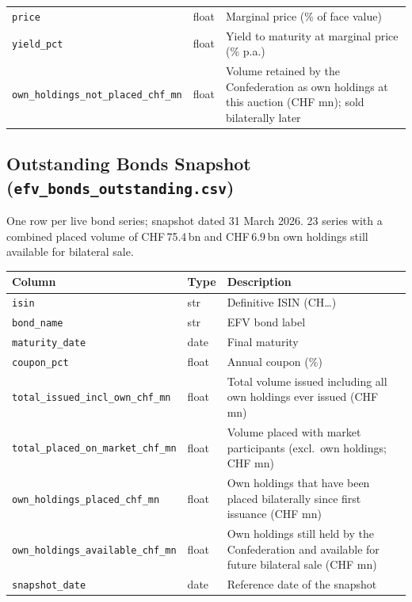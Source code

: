 \documentclass[12pt,a4paper]{article}
\begin{document}
\begin{longtable}{L{4.4cm} L{2.3cm} L{7.1cm}}
  \texttt{price}                  & float & Marginal price (\% of face value) \\[3pt]
  \texttt{yield\_pct}             & float & Yield to maturity at marginal price
                                            (\% p.a.) \\[3pt]
  \texttt{own\_holdings\_not\_placed\_chf\_mn} & float & Volume retained by the
                                            Confederation as own holdings
                                            at this auction (CHF mn);
                                            sold bilaterally later \\
\end{longtable}

\subsection{Outstanding Bonds Snapshot (\texttt{efv\_bonds\_outstanding.csv})}

One row per live bond series; snapshot dated 31 March 2026.  23 series with a
combined placed volume of CHF\,75.4\,bn and CHF\,6.9\,bn own holdings still
available for bilateral sale.

\begin{center}
\begin{tabular}{L{5.0cm} L{2.2cm} L{6.6cm}}
  \toprule
  \textbf{Column} & \textbf{Type} & \textbf{Description} \\
  \midrule
  \texttt{isin} & str & Definitive ISIN (CH\ldots) \\[3pt]
  \texttt{bond\_name} & str & EFV bond label \\[3pt]
  \texttt{maturity\_date} & date & Final maturity \\[3pt]
  \texttt{coupon\_pct} & float & Annual coupon (\%) \\[3pt]
  \texttt{total\_issued\_incl\_own\_chf\_mn} & float &
    Total volume issued including all own holdings ever issued (CHF mn) \\[3pt]
  \texttt{total\_placed\_on\_market\_chf\_mn} & float &
    Volume placed with market participants (excl.\ own holdings; CHF mn) \\[3pt]
  \texttt{own\_holdings\_placed\_chf\_mn} & float &
    Own holdings that have been placed bilaterally since first issuance
    (CHF mn) \\[3pt]
  \texttt{own\_holdings\_available\_chf\_mn} & float &
    Own holdings still held by the Confederation and available for future
    bilateral sale (CHF mn) \\[3pt]
  \texttt{snapshot\_date} & date & Reference date of the snapshot \\
  \bottomrule
\end{tabular}
\end{center}
\end{document}
